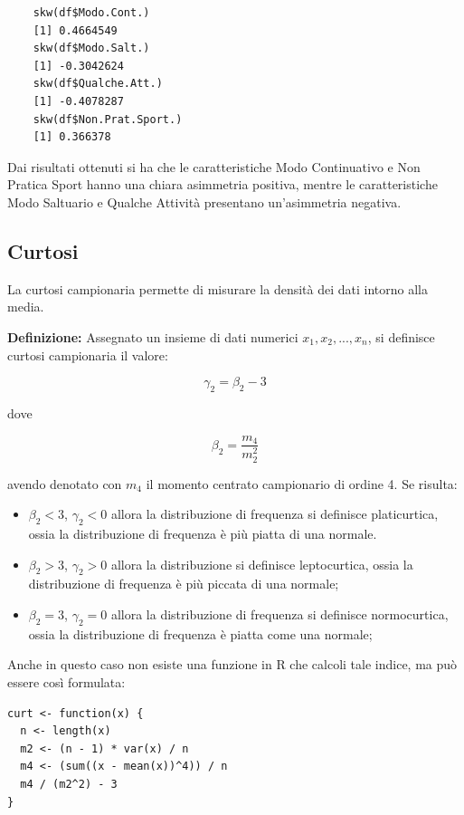 \vspace{5mm}
\begin{lstlisting}
    skw(df$Modo.Cont.)
    [1] 0.4664549
    skw(df$Modo.Salt.)
    [1] -0.3042624
    skw(df$Qualche.Att.)
    [1] -0.4078287
    skw(df$Non.Prat.Sport.)
    [1] 0.366378
\end{lstlisting}
\vspace{5mm}

Dai risultati ottenuti si ha che le caratteristiche Modo Continuativo e Non Pratica Sport hanno una chiara asimmetria positiva, mentre le caratteristiche Modo Saltuario e Qualche Attività presentano un'asimmetria negativa.

\subsection{Curtosi}\label{cap3.3.2}

La curtosi campionaria permette di misurare la densità dei dati intorno alla media.

\noindent \textbf{Definizione:} Assegnato un insieme di dati numerici $x_1, x_2, ..., x_n$, si definisce curtosi campionaria il valore:

\[\gamma_2 = \beta_2 - 3\]

dove

\[\beta_2 = \frac{m_4}{m_2^2}\]

avendo denotato con $m_4$ il momento centrato campionario di ordine 4. Se risulta:

\begin{itemize}
\item $\beta_2 < 3$, $\gamma_2<0$ allora la distribuzione di frequenza si definisce platicurtica, ossia la distribuzione di frequenza è più piatta di una normale.
\item $\beta_2 > 3$, $\gamma_2 > 0$ allora la distribuzione si definisce leptocurtica, ossia la distribuzione di frequenza è più piccata di una normale;
\item $\beta_2 = 3$, $\gamma_2 = 0$ allora la distribuzione di frequenza si definisce normocurtica, ossia la distribuzione di frequenza è piatta come una normale;
\end{itemize}

Anche in questo caso non esiste una funzione in R che calcoli tale indice, ma può essere così formulata:

\vspace{5mm}
\begin{lstlisting}
curt <- function(x) {
  n <- length(x)
  m2 <- (n - 1) * var(x) / n
  m4 <- (sum((x - mean(x))^4)) / n
  m4 / (m2^2) - 3
}
\end{lstlisting}
\vspace{5mm}


